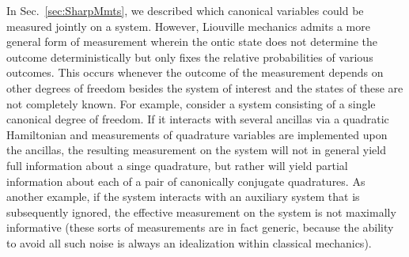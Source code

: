\documentclass[pra,superscriptaddress,nofootinbib,12pt]{revtex4-2}
\begin{document}
In Sec.~\ref{sec:SharpMmts}, we described which canonical variables could be measured jointly on a system.
However, Liouville mechanics admits a more general form of measurement wherein the ontic state does not determine the outcome deterministically but only fixes the relative probabilities of various outcomes.  This occurs whenever the outcome of the measurement depends on other degrees of freedom besides the system of interest and the states of these are not completely known. For example, consider a system consisting of a single canonical degree of freedom. If it interacts with several ancillas via a quadratic Hamiltonian and measurements of quadrature variables are implemented upon the ancillas, the resulting measurement on the system will not in general yield full information about a singe quadrature, but rather will yield partial information about each of a pair of canonically conjugate quadratures.  As another example, if the system interacts with an auxiliary system that is subsequently ignored, the effective measurement on the system is not maximally informative (these sorts of measurements are in fact generic, because the ability to avoid all such noise is always an idealization within classical mechanics).

\end{document}
